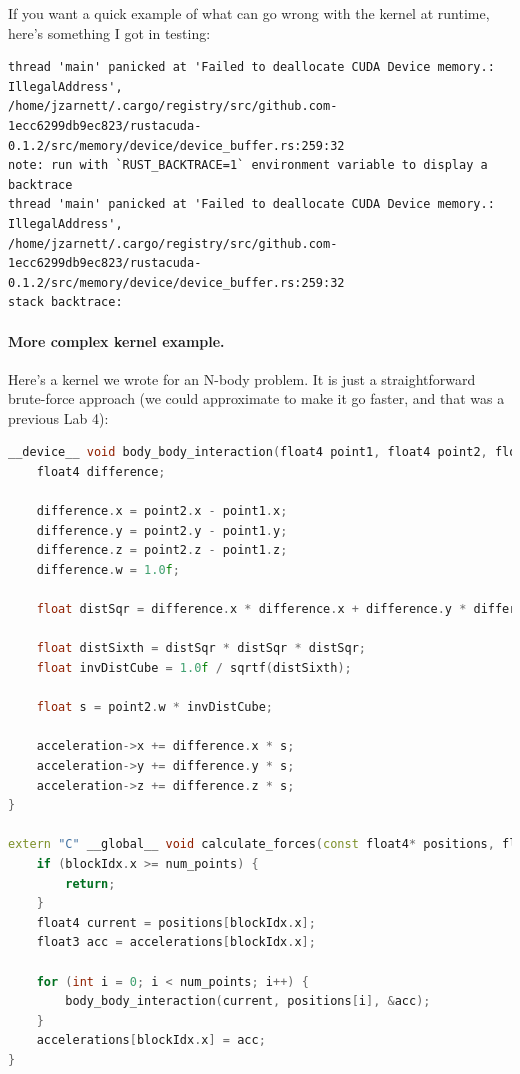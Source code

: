 If you want a quick example of what can go wrong with the kernel at runtime, here's something I got in testing:
{\scriptsize
\begin{verbatim}
thread 'main' panicked at 'Failed to deallocate CUDA Device memory.: IllegalAddress', 
/home/jzarnett/.cargo/registry/src/github.com-1ecc6299db9ec823/rustacuda-0.1.2/src/memory/device/device_buffer.rs:259:32
note: run with `RUST_BACKTRACE=1` environment variable to display a backtrace
thread 'main' panicked at 'Failed to deallocate CUDA Device memory.: IllegalAddress', 
/home/jzarnett/.cargo/registry/src/github.com-1ecc6299db9ec823/rustacuda-0.1.2/src/memory/device/device_buffer.rs:259:32
stack backtrace:
\end{verbatim}
}

\paragraph{More complex kernel example.} Here's a kernel we wrote for an N-body problem. It is just a straightforward brute-force approach (we could approximate to make it go faster, and that was a previous Lab 4):

\begin{lstlisting}[language=C++]
__device__ void body_body_interaction(float4 point1, float4 point2, float3 *acceleration) {
    float4 difference;

    difference.x = point2.x - point1.x;
    difference.y = point2.y - point1.y;
    difference.z = point2.z - point1.z;
    difference.w = 1.0f;

    float distSqr = difference.x * difference.x + difference.y * difference.y + difference.z * difference.z + 1e-10;

    float distSixth = distSqr * distSqr * distSqr;
    float invDistCube = 1.0f / sqrtf(distSixth);

    float s = point2.w * invDistCube;

    acceleration->x += difference.x * s;
    acceleration->y += difference.y * s;
    acceleration->z += difference.z * s;
}

extern "C" __global__ void calculate_forces(const float4* positions, float3* accelerations, int num_points) {
    if (blockIdx.x >= num_points) {
        return;
    }
    float4 current = positions[blockIdx.x];
    float3 acc = accelerations[blockIdx.x];

    for (int i = 0; i < num_points; i++) {
        body_body_interaction(current, positions[i], &acc);
    }
    accelerations[blockIdx.x] = acc;
}
\end{lstlisting}

